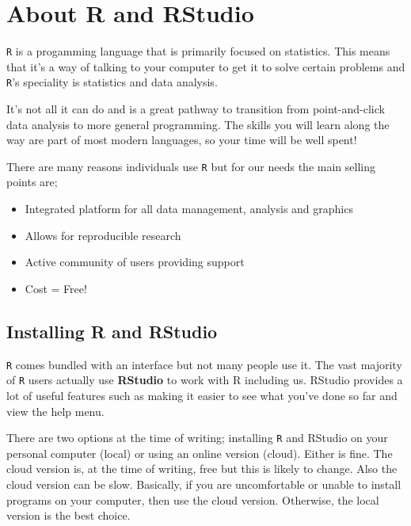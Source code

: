 \documentclass[]{book}
\providecommand{\tightlist}{%
  \setlength{\itemsep}{0pt}\setlength{\parskip}{0pt}}
\begin{document}
\hypertarget{about-r-and-rstudio}{%
\section{About R and RStudio}\label{about-r-and-rstudio}}

\texttt{R} is a progamming language that is primarily focused on statistics. This means that it's a way of talking to your computer to get it to solve certain problems and \texttt{R}'s speciality is statistics and data analysis.

It's not all it can do and is a great pathway to transition from point-and-click data analysis to more general programming. The skills you will learn along the way are part of most modern languages, so your time will be well spent!

There are many reasons individuals use \texttt{R} but for our needs the main selling points are;

\begin{itemize}
\tightlist
\item
  Integrated platform for all data management, analysis and graphics
\item
  Allows for reproducible research
\item
  Active community of users providing support
\item
  Cost = Free!
\end{itemize}

\hypertarget{installing-r-and-rstudio}{%
\subsection{Installing R and RStudio}\label{installing-r-and-rstudio}}

\texttt{R} comes bundled with an interface but not many people use it. The vast majority of \texttt{R} users actually use \textbf{RStudio} to work with R including us. RStudio provides a lot of useful features such as making it easier to see what you've done so far and view the help menu.

There are two options at the time of writing; installing \texttt{R} and RStudio on your personal computer (local) or using an online version (cloud). Either is fine. The cloud version is, at the time of writing, free but this is likely to change. Also the cloud version can be slow. Basically, if you are uncomfortable or unable to install programs on your computer, then use the cloud version. Otherwise, the local version is the best choice.
\end{document}
